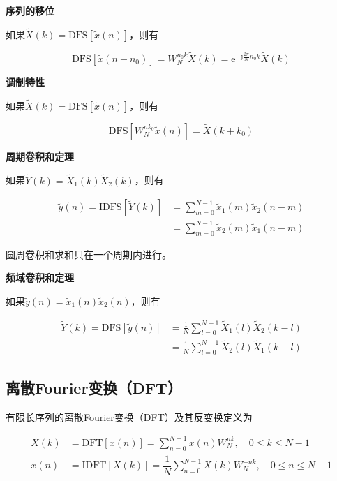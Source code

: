 \documentclass[cn, hazy, blue, normal, 12pt]{elegantnote}
\begin{document}
\textbf{序列的移位}

如果$\widetilde{X}(k)=\text{DFS}[\widetilde{x}(n)]$，则有

\begin{equation}
    \text{DFS}[\widetilde{x}(n-n_0)]=W_N^{n_0 k}\widetilde{X}(k)=\text{e}^{-\text{j}\frac{2\pi}{N}n_0 k}\widetilde{X}(k)
\end{equation}

\textbf{调制特性}

如果$\widetilde{X}(k)=\text{DFS}[\widetilde{x}(n)]$，则有

\begin{equation}
    \text{DFS}[W_N^{nk_0}\widetilde{x}(n)]=\widetilde{X}(k+k_0)
\end{equation}

\textbf{周期卷积和定理}

如果$\widetilde{Y}(k)=\widetilde{X}_1(k)\widetilde{X}_2(k)$，则有

\begin{equation}
\begin{aligned}
    \widetilde{y}(n)=\text{IDFS}[\widetilde{Y}(k)]&=\sum_{m=0}^{N-1}{\widetilde{x}_1(m)\widetilde{x}_2(n-m)} \\
    &=\sum_{m=0}^{N-1}{\widetilde{x}_2(m)\widetilde{x}_1(n-m)}
\end{aligned}
\end{equation}

圆周卷积和求和只在一个周期内进行。

\textbf{频域卷积和定理}

如果$\widetilde{y}(n)=\widetilde{x}_1(n)\widetilde{x}_2(n)$，则有

\begin{equation}
\begin{aligned}
    \widetilde{Y}(k)=\text{DFS}[\widetilde{y}(n)]&=\frac{1}{N}\sum_{l=0}^{N-1}{\widetilde{X}_1(l)\widetilde{X}_2(k-l)} \\
    &=\frac{1}{N}\sum_{l=0}^{N-1}{\widetilde{X}_2(l)\widetilde{X}_1(k-l)}
\end{aligned}
\end{equation}

\subsection{离散Fourier变换（DFT）}

有限长序列的离散Fourier变换（DFT）及其反变换定义为

\begin{equation}
\begin{aligned}
    {X}(k)&=\text{DFT}[{x}(n)]=\sum_{n=0}^{N-1}{{x}(n)W_{N}^{nk}}, \quad 0\leq k \leq N-1 \\
    {x}(n)&=\text{IDFT}[{X}(k)]=\dfrac{1}{N}\sum_{n=0}^{N-1}{{X}(k)W_{N}^{-nk}}, \quad 0\leq n \leq N-1
\end{aligned}
\end{equation}
\end{document}
